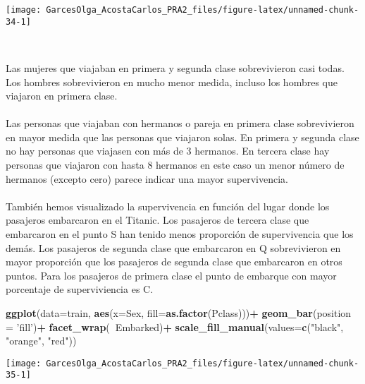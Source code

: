 \documentclass[
]{article}
\newenvironment{Shaded}{\begin{snugshade}}{\end{snugshade}}
\newcommand{\DataTypeTok}[1]{\textcolor[rgb]{0.13,0.29,0.53}{#1}}
\newcommand{\KeywordTok}[1]{\textcolor[rgb]{0.13,0.29,0.53}{\textbf{#1}}}
\newcommand{\NormalTok}[1]{#1}
\newcommand{\OperatorTok}[1]{\textcolor[rgb]{0.81,0.36,0.00}{\textbf{#1}}}
\newcommand{\StringTok}[1]{\textcolor[rgb]{0.31,0.60,0.02}{#1}}
\begin{document}
\begin{center}\texttt{[image: GarcesOlga\_AcostaCarlos\_PRA2\_files/figure-latex/unnamed-chunk-34-1]} \end{center}

\texttt{}~\\
\texttt{}

Las mujeres que viajaban en primera y segunda clase sobrevivieron casi
todas. Los hombres sobrevivieron en mucho menor medida, incluso los
hombres que viajaron en primera clase.\\
\texttt{}~\\
Las personas que viajaban con hermanos o pareja en primera clase
sobrevivieron en mayor medida que las personas que viajaron solas. En
primera y segunda clase no hay personas que viajasen con más de 3
hermanos. En tercera clase hay personas que viajaron con hasta 8
hermanos en este caso un menor número de hermanos (excepto cero) parece
indicar una mayor supervivencia.\\
\texttt{}~\\
También hemos visualizado la supervivencia en función del lugar donde
los pasajeros embarcaron en el Titanic. Los pasajeros de tercera clase
que embarcaron en el punto S han tenido menos proporción de
supervivencia que los demás. Los pasajeros de segunda clase que
embarcaron en Q sobrevivieron en mayor proporción que los pasajeros de
segunda clase que embarcaron en otros puntos. Para los pasajeros de
primera clase el punto de embarque con mayor porcentaje de
superviviencia es C.

\texttt{}

\begin{Shaded}
\begin{Highlighting}[]
\KeywordTok{ggplot}\NormalTok{(}\DataTypeTok{data=}\NormalTok{train, }\KeywordTok{aes}\NormalTok{(}\DataTypeTok{x=}\NormalTok{Sex, }\DataTypeTok{fill=}\KeywordTok{as.factor}\NormalTok{(Pclass)))}\OperatorTok{+}
\StringTok{  }\KeywordTok{geom_bar}\NormalTok{(}\DataTypeTok{position =} \StringTok{'fill'}\NormalTok{)}\OperatorTok{+}
\StringTok{  }\KeywordTok{facet_wrap}\NormalTok{(}\OperatorTok{~}\NormalTok{Embarked)}\OperatorTok{+}
\StringTok{  }\KeywordTok{scale_fill_manual}\NormalTok{(}\DataTypeTok{values=}\KeywordTok{c}\NormalTok{(}\StringTok{"black"}\NormalTok{, }\StringTok{"orange"}\NormalTok{, }\StringTok{"red"}\NormalTok{))}
\end{Highlighting}
\end{Shaded}

\begin{center}\texttt{[image: GarcesOlga\_AcostaCarlos\_PRA2\_files/figure-latex/unnamed-chunk-35-1]} \end{center}
\end{document}
